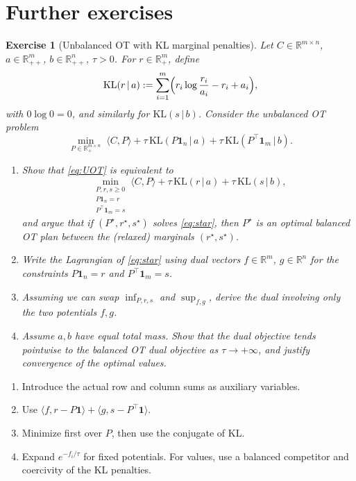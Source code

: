 \documentclass[11pt,a4paper]{article}
\theoremstyle{exostyle}
\newtheorem{exercise}{Exercise}
\newcommand{\R}{\mathbb{R}}
\newcommand{\ip}[2]{\langle #1,#2\rangle}
\begin{document}
\section*{Further exercises}

\begin{exercise}[Unbalanced OT with KL marginal penalties]\label{ex:uot}
Let $C\in\R^{m\times n}$, $a\in\R_{++}^m$, $b\in\R_{++}^n$, $\tau>0$. For $r\in\R_+^m$, define
\[
\mathrm{KL}(r\,|\,a) := \sum_{i=1}^m \Bigl( r_i \log\frac{r_i}{a_i} - r_i + a_i \Bigr),
\]
with $0\log 0=0$, and similarly for $\mathrm{KL}(s\,|\,b)$. Consider the unbalanced OT problem
\[
\min_{P\in\R_+^{m\times n}}\;
\ip{C}{P}
+ \tau\,\mathrm{KL}(P\mathbf 1_n \,|\, a)
+ \tau\,\mathrm{KL}(P^\top \mathbf 1_m \,|\, b).
\tag{UOT}
\label{eq:UOT}
\]
\begin{enumerate}[label=\textbf{(\arabic*)}]
  \item Show that \eqref{eq:UOT} is equivalent to
  \[
\min_{\substack{P,r,s\ge0\\ P\mathbf 1_n = r\\ P^\top \mathbf 1_m = s}}
  \ip{C}{P} + \tau\,\mathrm{KL}(r\,|\,a) + \tau\,\mathrm{KL}(s\,|\,b),
  \tag{$\star$}
  \label{eq:star}
  \]
  and argue that if $(P^\star,r^\star,s^\star)$ solves \eqref{eq:star}, then $P^\star$ is an optimal \emph{balanced} OT plan between the (relaxed) marginals $(r^\star,s^\star)$.
  \item Write the Lagrangian of \eqref{eq:star} using dual vectors $f\in\R^m$, $g\in\R^n$ for the constraints $P\mathbf 1_n=r$ and $P^\top \mathbf 1_m=s$.
  \item Assuming we can swap $\inf_{P,r,s}$ and $\sup_{f,g}$, derive the dual involving only the two potentials $f,g$.
  \item Assume $a,b$ have equal total mass. Show that the dual objective tends pointwise to the balanced OT dual objective as $\tau\to+\infty$, and justify convergence of the optimal values.
\end{enumerate}
\end{exercise}
\begin{hints}
\begin{enumerate}[label=(\arabic*)]\item Introduce the actual row and column sums as auxiliary variables.\item Use $\langle f,r-P\mathbf1\rangle+\langle g,s-P^\top\mathbf1\rangle$.\item Minimize first over $P$, then use the conjugate of KL.\item Expand $e^{-f_i/\tau}$ for fixed potentials. For values, use a balanced competitor and coercivity of the KL penalties.\end{enumerate}
\end{hints}
\end{document}
